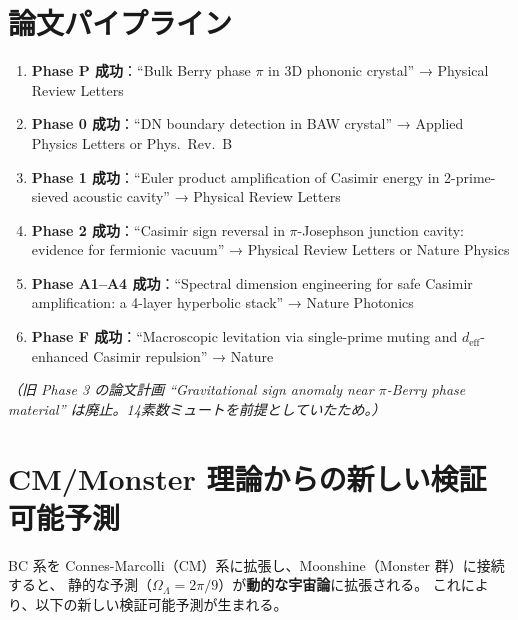 \documentclass[11pt,a4paper]{article}
\begin{document}
\section{論文パイプライン}

\begin{enumerate}
\item \textbf{Phase P 成功}：``Bulk Berry phase $\pi$ in 3D phononic crystal''
  → Physical Review Letters

\item \textbf{Phase 0 成功}：``DN boundary detection in BAW crystal''
  → Applied Physics Letters or Phys.\ Rev.\ B

\item \textbf{Phase 1 成功}：``Euler product amplification of Casimir energy
  in 2-prime-sieved acoustic cavity''
  → Physical Review Letters

\item \textbf{Phase 2 成功}：``Casimir sign reversal in $\pi$-Josephson
  junction cavity: evidence for fermionic vacuum''
  → Physical Review Letters or Nature Physics

\item \textbf{Phase A1--A4 成功}：``Spectral dimension engineering for safe
  Casimir amplification: a 4-layer hyperbolic stack''
  → Nature Photonics

\item \textbf{Phase F 成功}：``Macroscopic levitation via single-prime muting
  and $d_{\mathrm{eff}}$-enhanced Casimir repulsion''
  → Nature
\end{enumerate}

\textit{（旧 Phase 3 の論文計画 ``Gravitational sign anomaly near $\pi$-Berry
phase material'' は廃止。14素数ミュートを前提としていたため。）}


\section{CM/Monster 理論からの新しい検証可能予測}

BC 系を Connes-Marcolli（CM）系に拡張し、Moonshine（Monster 群）に接続すると、
静的な予測（$\Omega_\Lambda = 2\pi/9$）が\textbf{動的な宇宙論}に拡張される。
これにより、以下の新しい検証可能予測が生まれる。
\end{document}
